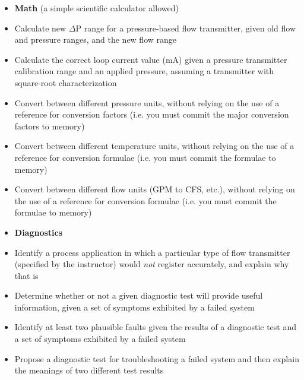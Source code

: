 \begin{itemize}
\item{} {\bf Math} (a simple scientific calculator  allowed)
\item{} Calculate new $\Delta$P range for a pressure-based flow transmitter, given old flow and pressure ranges, and the new flow range
\item{} Calculate the correct loop current value (mA) given a pressure transmitter calibration range and an applied pressure, assuming a transmitter with square-root characterization
\item{} Convert between different pressure units, without relying on the use of a reference for conversion factors (i.e. you must commit the major conversion factors to memory)
\item{} Convert between different temperature units, without relying on the use of a reference for conversion formulae (i.e. you must commit the formulae to memory)
\item{} Convert between different flow units (GPM to CFS, etc.), without relying on the use of a reference for conversion formulae (i.e. you must commit the formulae to memory)
\end{itemize}

\filbreak

\begin{itemize}
\item{} {\bf Diagnostics}
\item{} Identify a process application in which a particular type of flow transmitter (specified by the instructor) would {\it not} register accurately, and explain why that is
\item{} Determine whether or not a given diagnostic test will provide useful information, given a set of symptoms exhibited by a failed system
\item{} Identify at least two plausible faults given the results of a diagnostic test and a set of symptoms exhibited by a failed system
\item{} Propose a diagnostic test for troubleshooting a failed system and then explain the meanings of two different test results
\end{itemize}













